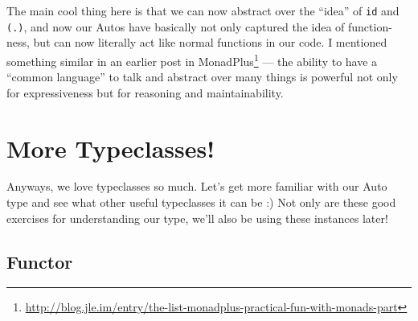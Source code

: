 \documentclass[]{article}
\newenvironment{Shaded}{}{}
\newcommand{\DecValTok}[1]{\textcolor[rgb]{0.25,0.63,0.44}{#1}}
\newcommand{\FunctionTok}[1]{\textcolor[rgb]{0.02,0.16,0.49}{#1}}
\newcommand{\NormalTok}[1]{#1}
\newcommand{\OperatorTok}[1]{\textcolor[rgb]{0.40,0.40,0.40}{#1}}
\renewcommand{\href}[2]{#2\footnote{\url{#1}}}
\begin{document}
\begin{Shaded}
\end{Shaded}

The main cool thing here is that we can now abstract over the ``idea'' of
\texttt{id} and \texttt{(.)}, and now our Autos have basically not only captured
the idea of function-ness, but can now literally act like normal functions in
our code. I mentioned something similar in an earlier post
\href{http://blog.jle.im/entry/the-list-monadplus-practical-fun-with-monads-part}{in
MonadPlus} --- the ability to have a ``common language'' to talk and abstract
over many things is powerful not only for expressiveness but for reasoning and
maintainability.

\section{More Typeclasses!}\label{more-typeclasses}

Anyways, we love typeclasses so much. Let's get more familiar with our Auto type
and see what other useful typeclasses it can be :) Not only are these good
exercises for understanding our type, we'll also be using these instances later!

\subsection{Functor}\label{functor}
\end{document}

